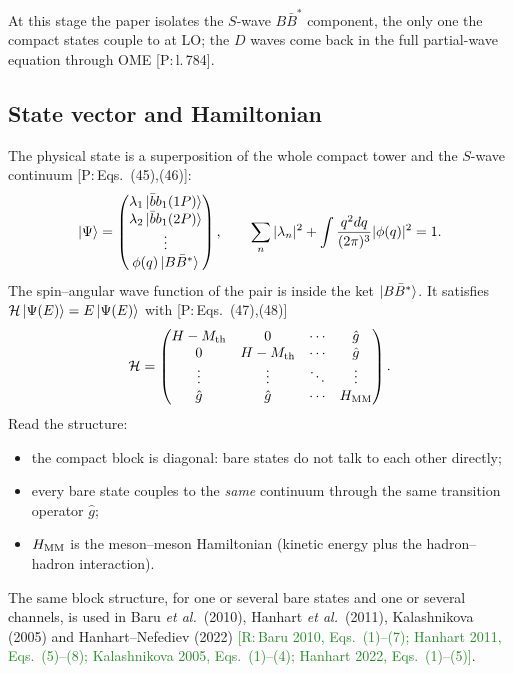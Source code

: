 \documentclass[11pt,a4paper]{article}
\newcommand{\tagP}[1]{\textcolor{blue!65!black}{\textsf{\small[P:\,#1]}}}
\newcommand{\tagR}[1]{\textcolor{ForestGreen}{\textsf{\small[R:\,#1]}}}
\newcommand{\bbar}{\bar b b}
\newcommand{\BBst}{B\bar B^*}
\newcommand{\Mth}{M_{\rm th}}
\begin{document}
At this stage the paper isolates the $S$-wave $\BBst$ component, the only one the compact states couple to at LO; the $D$ waves come back in the full partial-wave equation through OME \tagP{l.\,784}.

\subsection{State vector and Hamiltonian}

The physical state is a superposition of the whole compact tower and the $S$-wave continuum \tagP{Eqs.~(45),(46)}:
\begin{equation}
\ket{\Psi}=\begin{pmatrix}\lambda_1\ket{\bbar_1(1P)}\\ \lambda_2\ket{\bbar_1(2P)}\\ \vdots\\ \phi(q)\ket{\BBst}\end{pmatrix},\qquad
\sum_n|\lambda_n|^2+\int\frac{q^2dq}{(2\pi)^3}|\phi(q)|^2=1 .
\label{eq:state}
\end{equation}
The spin--angular wave function of the pair is inside the ket $\ket{\BBst}$. It satisfies $\mathcal H\ket{\Psi(E)}=E\ket{\Psi(E)}$ with \tagP{Eqs.~(47),(48)}
\begin{equation}
\mathcal H=\begin{pmatrix}
H-\Mth&0&\cdots&\hat g\\
0&H-\Mth&\cdots&\hat g\\
\vdots&\vdots&\ddots&\vdots\\
\hat g&\hat g&\cdots&H_{\rm MM}
\end{pmatrix}.
\label{eq:H}
\end{equation}
Read the structure:
\begin{itemize}
\item the compact block is diagonal: bare states do not talk to each other directly;
\item every bare state couples to the \emph{same} continuum through the same transition operator $\hat g$;
\item $H_{\rm MM}$ is the meson--meson Hamiltonian (kinetic energy plus the hadron--hadron interaction).
\end{itemize}
The same block structure, for one or several bare states and one or several channels, is used in Baru \emph{et al.}\ (2010), Hanhart \emph{et al.}\ (2011), Kalashnikova (2005) and Hanhart--Nefediev (2022) \tagR{Baru 2010, Eqs.~(1)--(7); Hanhart 2011, Eqs.~(5)--(8); Kalashnikova 2005, Eqs.~(1)--(4); Hanhart 2022, Eqs.~(1)--(5)}.
\end{document}
